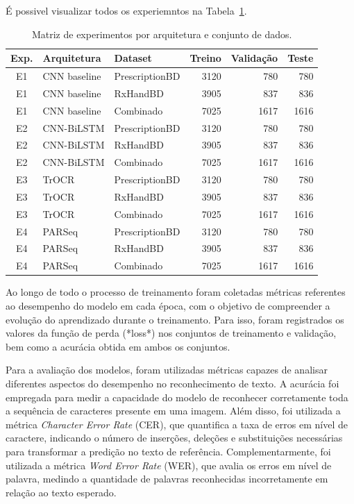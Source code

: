 \documentclass[11pt,a4paper]{article}
\begin{document}
É possivel visualizar todos os experiemntos na Tabela~\ref{tab:matriz-experimentos}.
\begin{table}[H]
	\centering
	\caption{Matriz de experimentos por arquitetura e conjunto de dados.}
	\label{tab:matriz-experimentos}
	\begin{tabular}{cllrrr}
		\toprule
		\textbf{Exp.} &
		\textbf{Arquitetura} &
		\textbf{Dataset} &
		\textbf{Treino} &
		\textbf{Validação} &
		\textbf{Teste} \\
		\midrule
		
		E1 & CNN baseline & PrescriptionBD & 3120 & 780  & 780  \\
		E1 & CNN baseline & RxHandBD       & 3905 & 837  & 836  \\
		E1 & CNN baseline & Combinado      & 7025 & 1617 & 1616 \\
		\midrule
		
		E2 & CNN-BiLSTM   & PrescriptionBD & 3120 & 780  & 780  \\
		E2 & CNN-BiLSTM   & RxHandBD       & 3905 & 837  & 836  \\
		E2 & CNN-BiLSTM   & Combinado      & 7025 & 1617 & 1616 \\
		\midrule
		
		E3 & TrOCR        & PrescriptionBD & 3120 & 780  & 780  \\
		E3 & TrOCR        & RxHandBD       & 3905 & 837  & 836  \\
		E3 & TrOCR        & Combinado      & 7025 & 1617 & 1616 \\
		\midrule
		
		E4 & PARSeq       & PrescriptionBD & 3120 & 780  & 780  \\
		E4 & PARSeq       & RxHandBD       & 3905 & 837  & 836  \\
		E4 & PARSeq       & Combinado      & 7025 & 1617 & 1616 \\
		\bottomrule
	\end{tabular}
\end{table}

Ao longo de todo o processo de treinamento foram coletadas métricas referentes ao desempenho do modelo em cada época, com o objetivo de compreender a evolução do aprendizado durante o treinamento. Para isso, foram registrados os valores da função de perda (*loss*) nos conjuntos de treinamento e validação, bem como a acurácia obtida em ambos os conjuntos.

Para a avaliação dos modelos, foram utilizadas métricas capazes de analisar diferentes aspectos do desempenho no reconhecimento de texto. A acurácia foi empregada para medir a capacidade do modelo de reconhecer corretamente toda a sequência de caracteres presente em uma imagem. Além disso, foi utilizada a métrica \textit{Character Error Rate} (CER), que quantifica a taxa de erros em nível de caractere, indicando o número de inserções, deleções e substituições necessárias para transformar a predição no texto de referência. Complementarmente, foi utilizada a métrica \textit{Word Error Rate} (WER), que avalia os erros em nível de palavra, medindo a quantidade de palavras reconhecidas incorretamente em relação ao texto esperado.
\end{document}
